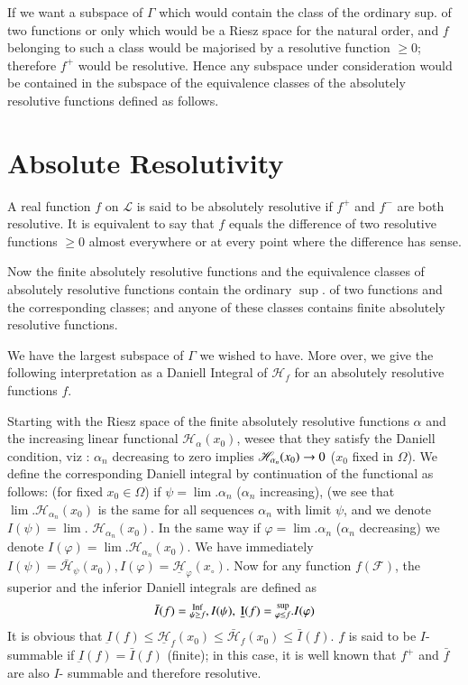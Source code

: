 If we want a subspace of $\Gamma$ which would contain the class of the
ordinary sup. of two functions or only which would be a Riesz space
for the natural order, and $f$ belonging to such a class would be
majorised by a resolutive function $\ge 0$; therefore $f^+$ would be
resolutive. Hence any subspace under consideration would be contained
in the subspace of the equivalence classes of the absolutely
resolutive functions defined as follows. 

\section{Absolute Resolutivity}\label{p4:chap5:sec25} %

\begin{defn}\label{p4:chap5:sec25:def19} %
  A real function $f$ on $\mathscr{L} $ is said to be absolutely
  resolutive if $f^+$ and $f^-$ are both resolutive. It is equivalent
  to say that $f$ equals the difference of two resolutive functions
  $\ge 0$ almost everywhere or at every point where the difference has
  sense. 
\end{defn}

Now the finite absolutely resolutive functions and the equivalence
classes of absolutely resolutive functions contain \resp the ordinary
$\sup$. of two functions and the corresponding classes; and anyone of
these classes contains finite absolutely resolutive functions. 

We have the largest subspace of $\Gamma$ we wished to have. More over,
we give the following interpretation as a Daniell Integral of
$\mathscr{H}_f$ for an absolutely resolutive functions $f$. 

Starting with the Riesz space of the finite absolutely resolutive
functions $\alpha $ and the increasing linear functional
$\mathscr{H}_\alpha (x_0)$, we\pageoriginale see that they satisfy the Daniell
condition, viz : $\alpha_n$ decreasing to zero implies
$\mathscr{H}_{\alpha_n} (x_0)\break \to 0$ ($x_0$ fixed in $\Omega$). We
define the corresponding Daniell integral by continuation of the
functional as follows: (for fixed $x_0 \in \Omega$) if $\psi =
\lim. \alpha_n$ ($\alpha_n$  increasing), (we see that
$\lim. \mathscr{H}_{\alpha_n} (x_0)$ is the same for all sequences
$\alpha_n$ with limit $\psi$, and we denote $I
(\psi)=\lim$. $\mathscr{H}_{\alpha_n}(x_0)$. In the same way if
$\varphi = \lim. \alpha_n$ ($ \alpha_n$ decreasing) we denote $I
(\varphi) = \lim. \mathscr{H}_{\alpha_n}(x_0)$. We have immediately $I
(\psi) = \bar{\mathscr{H}}_\psi (x_0), I (\varphi) =
\underline{\mathscr{H}}_\varphi (x_\circ)$. Now for any function
$f(\mathscr{F})$, the superior and the inferior Daniell integrals are
defined as  
$$
\bar{I}(f) = {\substack{\operatorname{Inf}\\\psi \geq f}}, I (\psi), ~ \underbar{I} (f) =
\substack{\sup\\{\varphi \leq f}}. I (\varphi) 
$$
It is obvious that $\underbar{I}(f) \leq \underline{\mathscr{H}}_f
(x_0) \leq \bar{\mathscr{H}}_f (x_0) \leq \bar{I}(f)$. $f$ is said to
be $I$-summable if $\underbar{I}(f) = \bar{I}(f)$ (finite); in this
case, it is well known that $f^+$ and $\bar{f}$ are also $I$- summable
and therefore resolutive. 

